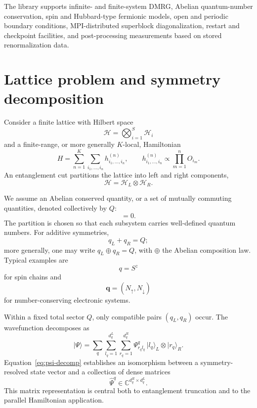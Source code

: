 \documentclass[11pt,a4paper]{article}
\newcommand{\ket}[1]{\lvert #1\rangle}
\newcommand{\Hil}{\mathcal H}
\begin{document}
The library supports infinite- and finite-system DMRG, Abelian quantum-number
conservation, spin and Hubbard-type fermionic models, open and periodic
boundary conditions, MPI-distributed superblock diagonalization, restart and
checkpoint facilities, and post-processing measurements based on stored
renormalization data.

\section{Lattice problem and symmetry decomposition}

Consider a finite lattice with Hilbert space
\begin{equation}
  \Hil=\bigotimes_{i=1}^{S}\Hil_i
\end{equation}
and a finite-range, or more generally $K$-local, Hamiltonian
\begin{equation}
  H=\sum_{n=1}^{K}\sum_{i_1,\ldots,i_n}
  h^{(n)}_{i_1,\ldots,i_n},
  \qquad
  h^{(n)}_{i_1,\ldots,i_n}\propto
  \prod_{m=1}^{n}O_{i_m}.
\end{equation}
An entanglement cut partitions the lattice into left and right components,
\begin{equation}
  \Hil=\Hil_L\otimes\Hil_R.
\end{equation}

We assume an Abelian conserved quantity, or a set of mutually commuting
quantities, denoted collectively by $Q$:
\begin{equation}
  [H,Q]=0.
\end{equation}
The partition is chosen so that each subsystem carries well-defined quantum
numbers.  For additive symmetries,
\begin{equation}
  q_L+q_R=Q;
\end{equation}
more generally, one may write $q_L\oplus q_R=Q$, with $\oplus$ the Abelian
composition law.  Typical examples are
\begin{equation}
  q=S^z
\end{equation}
for spin chains and
\begin{equation}
  \boldsymbol q=(N_\uparrow,N_\downarrow)
\end{equation}
for number-conserving electronic systems.

Within a fixed total sector $Q$, only compatible pairs $(q_L,q_R)$ occur.
The wavefunction decomposes as
\begin{equation}
  \ket{\Psi}
  =\sum_q\sum_{l_q=1}^{d_q^L}\sum_{r_q=1}^{d_q^R}
  \Psi^q_{r_ql_q}\,
  \ket{l_q}_L\otimes\ket{r_q}_R.
  \label{eq:psi-decomp}
\end{equation}
Equation~\eqref{eq:psi-decomp} establishes an isomorphism between a
symmetry-resolved state vector and a collection of dense matrices
\begin{equation}
  \widehat\Psi^q\in\mathbb C^{d_q^R\times d_q^L}.
\end{equation}
This matrix representation is central both to entanglement truncation and to
the parallel Hamiltonian application.
\end{document}
